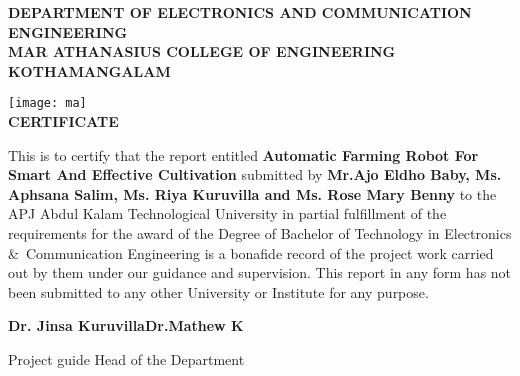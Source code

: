 \documentclass[12pt,a4paper]{report}
\date{}
\title{{\bf \Large AUTOMATIC FARMING ROBOT FOR SMART AND EFFECTIVE CULTIVATION  }\\    
\vspace{0.2cm}
{\normalsize {A PROJECT REPORT}}\\
\vspace{0.2cm}
{\normalsize{ submitted by}}\\
\vspace{0.20 cm}
{\normalsize\textbf{AJO ELDHO BABY}} \\
\normalsize {Reg. No :\textbf{ MAC15EC010}}\\
\vspace{0.20 cm}
{\normalsize\textbf{APHSANA SALIM}} \\
\normalsize {Reg. No :\textbf{ MAC15EC029}}\\
\vspace{0.20 cm}
{\normalsize\textbf{RIYA KURUVILLA}} \\
\normalsize {Reg. No :\textbf{ MAC15EC104}}\\
\vspace{0.20 cm}
\normalsize {\textbf{ ROSE MARY BENNY}}\\
\normalsize {Reg. No :\textbf{ MAC15EC107}}\\
\vspace{0.20 cm}
\normalsize{to}\\ 
\vspace{0.4cm}
\normalsize {the APJ Abdul Kalam Technological University}\\
\normalsize {in partial fulfillment of the requirements for the award of the Degree}\\
\vspace{0.4cm}
\normalsize {of}\\
\vspace{0.4cm}  
\normalsize {Bachelor of Technology}\\  
\normalsize {in} \\
\normalsize {\emph{  Electronics and Communication Engineering} }\\
\begin{figure}[H]
\centering
\texttt{[image: ma]}
\end{figure}
{\large \textbf {Department of  Electronics and Communication Engineering}}\\
\vspace{0.4cm}
\normalsize {Mar Athanasius College of Engineering}\\
\normalsize {Kothamangalam, Kerala, India 686 666}\\
\vspace{0.4cm}
\author \large {MAY 2019}}
\begin{document}
\newpage
\maketitle
\begin{center}
{\large \bf{DEPARTMENT OF ELECTRONICS AND COMMUNICATION ENGINEERING}}\\
{\large \bf{MAR ATHANASIUS COLLEGE OF ENGINEERING}}\\
{\large \bf{KOTHAMANGALAM}}
\end{center}
\begin{center}
\thispagestyle{empty}
\texttt{[image: ma]}\\[7pt]
\large{\bf{CERTIFICATE}}
\end{center}
\onehalfspacing This is to certify that the report entitled {\large{ \textbf{Automatic Farming Robot For Smart And Effective Cultivation  }}} submitted by \textbf{Mr.Ajo Eldho Baby, Ms. Aphsana Salim, Ms. Riya Kuruvilla and Ms. Rose Mary Benny} to the APJ Abdul Kalam Technological University in partial fulfillment of the requirements for the award of the Degree of Bachelor of Technology in  Electronics \&\ Communication Engineering is a bonafide record of the project work carried out by them under our guidance and supervision. This report in any form has not been submitted to any other University or Institute for any purpose.
\vspace{0.8in}
\begin{flushleft}
{\large{\textbf{Dr. Jinsa Kuruvilla}}}\hfill{\large {\textbf{Dr.Mathew K}}}
\end{flushleft}

\begin{flushleft}
Project guide                               \hfill{Head of the Department}
\end{flushleft}
 
\end{document}
